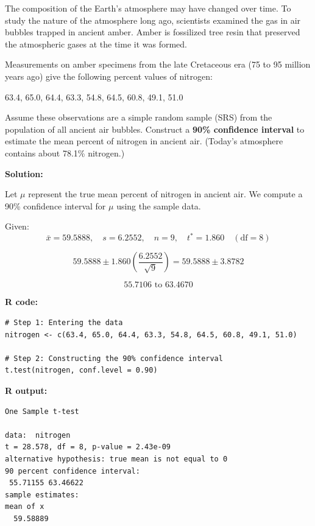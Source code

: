 \begin{example}

The composition of the Earth's atmosphere may have changed over time. To study the nature of the atmosphere long ago, scientists examined the gas in air bubbles trapped in ancient amber. Amber is fossilized tree resin that preserved the atmospheric gases at the time it was formed.

Measurements on amber specimens from the late Cretaceous era (75 to 95 million years ago) give the following percent values of nitrogen:

\begin{center}
63.4, 65.0, 64.4, 63.3, 54.8, 64.5, 60.8, 49.1, 51.0
\end{center}

Assume these observations are a simple random sample (SRS) from the population of all ancient air bubbles. Construct a \textbf{90\% confidence interval} to estimate the mean percent of nitrogen in ancient air. (Today’s atmosphere contains about 78.1\% nitrogen.)

\vspace{1em}
\textbf{Solution:}

Let \(\mu\) represent the true mean percent of nitrogen in ancient air. We compute a 90\% confidence interval for \(\mu\) using the sample data.

Given: 
\[
\bar{x} = 59.5888, \quad s = 6.2552, \quad n = 9, \quad t^* = 1.860 \quad (\text{df} = 8)
\]

\[
59.5888 \pm 1.860 \left( \frac{6.2552}{\sqrt{9}} \right) = 59.5888 \pm 3.8782
\]

\[
\boxed{55.7106 \text{ to } 63.4670}
\]

\vspace{1em}
\noindent\textbf{R code:}

\begin{tcolorbox}[colback=gray!10, colframe=black!45, arc=2mm]

\begin{verbatim}
# Step 1: Entering the data
nitrogen <- c(63.4, 65.0, 64.4, 63.3, 54.8, 64.5, 60.8, 49.1, 51.0)

# Step 2: Constructing the 90% confidence interval
t.test(nitrogen, conf.level = 0.90)
\end{verbatim}
\end{tcolorbox}

\vspace{1em}
\noindent\textbf{R output:}

\begin{tcolorbox}[colback=gray!10, colframe=black!45, arc=2mm]
\begin{verbatim}
One Sample t-test

data:  nitrogen
t = 28.578, df = 8, p-value = 2.43e-09
alternative hypothesis: true mean is not equal to 0
90 percent confidence interval:
 55.71155 63.46622
sample estimates:
mean of x 
  59.58889 
\end{verbatim}
\end{tcolorbox}

\end{example}
